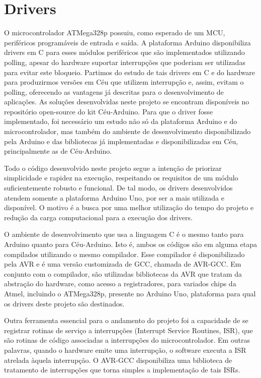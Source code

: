 \documentclass[11pt]{article}
\begin{document}
\section{Drivers}
\tab O microcontrolador ATMega328p possuiu, como esperado de um MCU, periféricos programáveis de entrada e saída. A plataforma Arduino disponibiliza drivers em C para esses módulos periféricos que são implementados utilizando polling, apesar do hardware suportar interrupções que poderiam ser utilizadas para evitar este bloqueio. Partimos do estudo de tais drivers em C e do hardware para produzirmos versões em Céu que utilizem interrupção e, assim, evitam o polling, oferecendo as vantagens já descritas para o desenvolvimento de aplicações. As soluções desenvolvidas neste projeto se encontram disponíveis no repositório open-source do kit Céu-Arduino. Para que o driver fosse implementado, foi necessário um estudo não só da plataforma Arduino e do microcontrolador, mas também do ambiente de desenvolvimento disponibilizado pela Arduino e das bibliotecas já implementadas e disponibilizadas em Céu, principalmente as de Céu-Arduino.
\par Todo o código desenvolvido neste projeto segue a intenção de priorizar simplicidade e rapidez na execução, respeitando os requisitos de um módulo suficientemente robusto e funcional. De tal modo, os drivers desenvolvidos atendem somente a plataforma Arduino Uno, por ser a mais utilizada e disponível. O motivo é a busca por uma melhor utilização do tempo do projeto e redução da carga computacional para a execução dos drivers.
\par O ambiente de desenvolvimento que usa a linguagem C é o mesmo tanto para Arduino quanto para Céu-Arduino. Isto é, ambos os códigos são em alguma etapa compilados utilizando o mesmo compilador. Esse compilador é disponibilizado pela AVR e é uma versão customizada de GCC, chamada de AVR-GCC. Em conjunto com o compilador, são utilizadas bibliotecas da AVR que tratam da abstração do hardware, como acesso a registradores, para variados chips da Atmel, incluindo o ATMega328p, presente no Arduino Uno, plataforma para qual os drivers deste projeto são destinados.
\par Outra ferramenta essencial para o andamento do projeto foi a capacidade de se registrar rotinas de serviço a interrupções (Interrupt Service Routines, ISR), que são rotinas de código associadas a interrupções do microcontrolador. Em outras palavras, quando o hardware emite uma interrupção, o software executa a ISR atrelada àquela interrupção. O AVR-GCC disponibiliza uma biblioteca de tratamento de interrupções que torna simples a implementação de tais ISRs.
\end{document}
